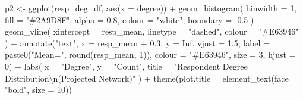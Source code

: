 \documentclass[
  letterpaper,
  DIV=11,
  numbers=noendperiod]{scrartcl}
\newenvironment{Shaded}{\begin{snugshade}}{\end{snugshade}}
\newcommand{\AttributeTok}[1]{\textcolor[rgb]{0.40,0.45,0.13}{#1}}
\newcommand{\ConstantTok}[1]{\textcolor[rgb]{0.56,0.35,0.01}{#1}}
\newcommand{\DecValTok}[1]{\textcolor[rgb]{0.68,0.00,0.00}{#1}}
\newcommand{\FloatTok}[1]{\textcolor[rgb]{0.68,0.00,0.00}{#1}}
\newcommand{\FunctionTok}[1]{\textcolor[rgb]{0.28,0.35,0.67}{#1}}
\newcommand{\NormalTok}[1]{\textcolor[rgb]{0.00,0.23,0.31}{#1}}
\newcommand{\OtherTok}[1]{\textcolor[rgb]{0.00,0.23,0.31}{#1}}
\newcommand{\SpecialCharTok}[1]{\textcolor[rgb]{0.37,0.37,0.37}{#1}}
\newcommand{\StringTok}[1]{\textcolor[rgb]{0.13,0.47,0.30}{#1}}
\begin{document}
\begin{Shaded}
\begin{Highlighting}[]
\NormalTok{p2 }\OtherTok{\textless{}{-}} \FunctionTok{ggplot}\NormalTok{(resp\_deg\_df, }\FunctionTok{aes}\NormalTok{(}\AttributeTok{x =}\NormalTok{ degree)) }\SpecialCharTok{+}
  \FunctionTok{geom\_histogram}\NormalTok{(}
    \AttributeTok{binwidth =} \DecValTok{1}\NormalTok{, }\AttributeTok{fill =} \StringTok{"\#2A9D8F"}\NormalTok{, }\AttributeTok{alpha =} \FloatTok{0.8}\NormalTok{,}
    \AttributeTok{colour =} \StringTok{"white"}\NormalTok{, }\AttributeTok{boundary =} \SpecialCharTok{{-}}\FloatTok{0.5}
\NormalTok{  ) }\SpecialCharTok{+}
  \FunctionTok{geom\_vline}\NormalTok{(}
    \AttributeTok{xintercept =}\NormalTok{ resp\_mean,}
    \AttributeTok{linetype =} \StringTok{"dashed"}\NormalTok{, }\AttributeTok{colour =} \StringTok{"\#E63946"}
\NormalTok{  ) }\SpecialCharTok{+}
  \FunctionTok{annotate}\NormalTok{(}\StringTok{"text"}\NormalTok{, }\AttributeTok{x =}\NormalTok{ resp\_mean }\SpecialCharTok{+} \FloatTok{0.3}\NormalTok{, }\AttributeTok{y =} \ConstantTok{Inf}\NormalTok{, }\AttributeTok{vjust =} \FloatTok{1.5}\NormalTok{,}
           \AttributeTok{label =} \FunctionTok{paste0}\NormalTok{(}\StringTok{"Mean="}\NormalTok{, }\FunctionTok{round}\NormalTok{(resp\_mean, }\DecValTok{1}\NormalTok{)),}
           \AttributeTok{colour =} \StringTok{"\#E63946"}\NormalTok{, }\AttributeTok{size =} \DecValTok{3}\NormalTok{, }\AttributeTok{hjust =} \DecValTok{0}\NormalTok{) }\SpecialCharTok{+}
  \FunctionTok{labs}\NormalTok{(}
    \AttributeTok{x =} \StringTok{"Degree"}\NormalTok{, }\AttributeTok{y =} \StringTok{"Count"}\NormalTok{,}
    \AttributeTok{title =} \StringTok{"Respondent Degree Distribution}\SpecialCharTok{\textbackslash{}n}\StringTok{(Projected Network)"}
\NormalTok{  ) }\SpecialCharTok{+}
  \FunctionTok{theme}\NormalTok{(}\AttributeTok{plot.title =} \FunctionTok{element\_text}\NormalTok{(}\AttributeTok{face =} \StringTok{"bold"}\NormalTok{, }\AttributeTok{size =} \DecValTok{10}\NormalTok{))}


\end{Highlighting}
\end{Shaded}
\end{document}
